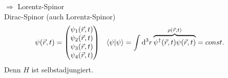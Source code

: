 $\Rightarrow$ Lorentz-Spinor
\\
Dirac-Spinor (auch Lorentz-Spinor)
	\begin{align*}
		\psi (\vec{r}, t) &=
		\begin{pmatrix}
		\psi_1 (\vec{r}, t) \\
		\psi_2 (\vec{r}, t) \\
		\psi_3 (\vec{r}, t) \\
		\psi_4 (\vec{r}, t)
		\end{pmatrix} &
		\braket{\psi | \psi}
		&= \int \diff^3 r 
		\overbrace{\psi^\dagger (\vec{r}, t) \psi (\vec{r}, t)}^{\mathclap{\rho (\vec{r}, t)}} 
		= const.
	\end{align*}
Denn $H$ ist selbstadjungiert. 


